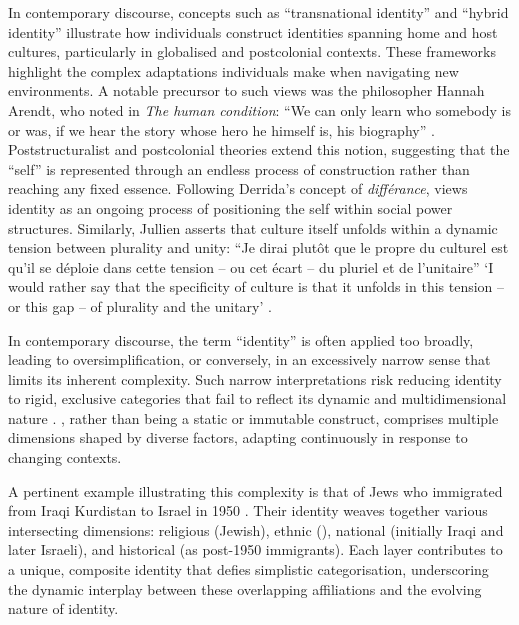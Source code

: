 \documentclass[output=paper,colorlinks,citecolor=brown]{langscibook}
\begin{document}
In contemporary discourse, concepts such as ``transnational identity'' \citep{vertovec1999} and ``hybrid identity'' \citep{bhabha1994,hall1990} illustrate how individuals construct identities spanning home and host cultures, particularly in globalised and postcolonial contexts. These frameworks highlight the complex adaptations individuals make when navigating new environments. A notable precursor to such views was the philosopher Hannah Arendt, who noted in \textit{The human condition}: ``We can only learn who somebody is or was, if we hear the story whose hero he himself is, his biography'' \citep{arendt2020,arendt1998}. Poststructuralist and postcolonial theories extend this notion, suggesting that the ``self'' is represented through an endless process of construction rather than reaching any fixed essence. Following Derrida's concept of \textit{différance}, \citet{hall1990} views identity as an ongoing process of positioning the self within social power structures. Similarly, Jullien asserts that culture itself unfolds within a dynamic tension between plurality and unity: ``Je dirai plutôt que le propre du culturel est qu'il se déploie dans cette tension -- ou cet écart -- du pluriel et de l'unitaire'' `I would rather say that the specificity of culture is that it unfolds in this tension -- or this gap -- of plurality and the unitary' \citep[46]{jullien2016}.

In contemporary discourse, the term ``identity'' is often applied too broadly, leading to oversimplification, or conversely, in an excessively narrow sense that limits its inherent complexity. Such narrow interpretations risk reducing identity to rigid, exclusive categories that fail to reflect its dynamic and multidimensional nature \citep{gholami2023,brubaker_cooper2000}. , rather than being a static or immutable construct, comprises multiple dimensions shaped by diverse factors, adapting continuously in response to changing contexts.

A pertinent example illustrating this complexity is that of  Jews who immigrated from Iraqi Kurdistan to Israel in 1950 \citep{shwartz-beeri_yisrael2000}. Their identity weaves together various intersecting dimensions: religious (Jewish), ethnic (), national (initially Iraqi and later Israeli), and historical (as post-1950 immigrants). Each layer contributes to a unique, composite identity that defies simplistic categorisation, underscoring the dynamic interplay between these overlapping affiliations and the evolving nature of identity.
\end{document}
